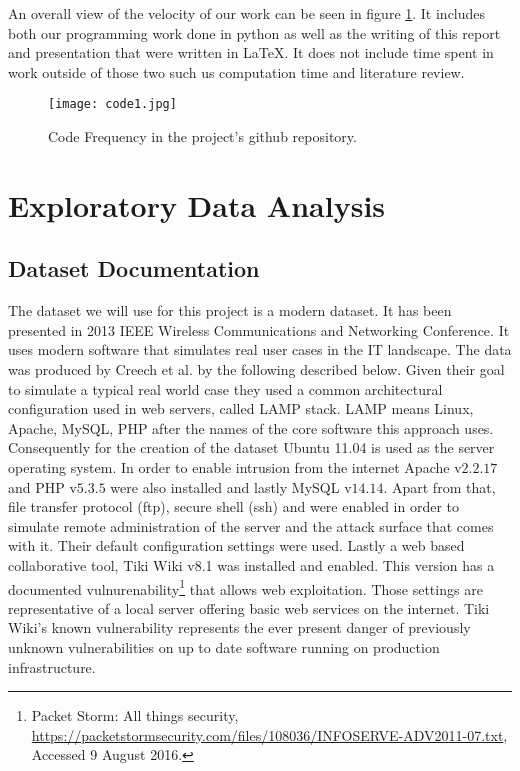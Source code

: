 \documentclass[reqno,openany,12pt]{amsbook}
\begin{document}
An overall view of the velocity of our work can be seen in figure \ref{code1}. It includes both our programming work done in python as well as the writing of this report and presentation that were written in \LaTeX. It does not include time spent in work outside of those two such us computation time and literature review.
\begin{figure}[b]
\texttt{[image: code1.jpg]}
\caption{Code Frequency in the project's github repository.}
\label{code1}
\end{figure}

\chapter{Exploratory Data Analysis}

\section{Dataset Documentation}

The dataset we will use for this project is a modern dataset. It has been presented in 2013 IEEE Wireless Communications and Networking Conference\cite{dat2}. It uses modern software that simulates real user cases in the IT landscape. The data was produced by Creech et al.\cite{dat2} by the following described below. Given their goal to simulate a typical real world case they used a common architectural configuration used in web servers, called LAMP stack. LAMP means Linux, Apache, MySQL, PHP after the names of the core software this approach uses. Consequently for the creation of the dataset Ubuntu 11.04 is used as the server operating system. In order to enable intrusion from the internet Apache v$2.2.17$ and PHP v$5.3.5$ were also installed and lastly MySQL v$14.14$. Apart from that, file transfer protocol (ftp), secure shell (ssh) and  were enabled in order to simulate remote administration of the server and the attack surface that comes with it. Their default configuration settings were used. Lastly a web based collaborative tool, Tiki Wiki v8.1 was installed and enabled. This version has a documented vulnurenability\footnote{Packet Storm: All things security, \url{https://packetstormsecurity.com/files/108036/INFOSERVE-ADV2011-07.txt}, Accessed 9 August 2016.} that allows web exploitation. Those settings are representative of a local server offering basic web services on the internet. Tiki Wiki's known vulnerability represents the ever present danger of previously unknown vulnerabilities on up to date software running on production infrastructure.
\end{document}
